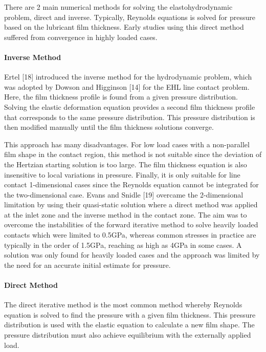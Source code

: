 There are 2 main numerical methods for solving the elastohydrodynamic problem, direct and inverse. Typically, Reynolds equations is solved for pressure based on the lubricant film thickness. Early studies using this direct method suffered from convergence in highly loaded cases.

\paragraph{Inverse Method}

Ertel [18] introduced the inverse method for the hydrodynamic problem, which was adopted by Dowson and Higginson [14] for the EHL line contact problem. Here, the film thickness profile is found from a given pressure distribution. Solving the elastic deformation equation provides a second film thickness profile that corresponds to the same pressure distribution. This pressure distribution is then modified manually until the film thickness solutions converge.

This approach has many disadvantages. For low load cases with a non-parallel film shape in the contact region, this method is not suitable since the deviation of the Hertzian starting solution is too large. The film thickness equation is also insensitive to local variations in pressure. Finally, it is only suitable for line contact 1-dimensional cases since the Reynolds equation cannot be integrated for the two-dimensional case. Evans and Snidle [19] overcame the 2-dimensional limitation by using their quasi-static solution where a direct method was applied at the inlet zone and the inverse method in the contact zone. The aim was to overcome the instabilities of the forward iterative method to solve heavily loaded contacts which were limited to 0.5GPa, whereas common stresses in practice are typically in the order of 1.5GPa, reaching as high as 4GPa in some cases. A solution was only found for heavily loaded cases and the approach was limited by the need for an accurate initial estimate for pressure.

\paragraph{Direct Method}

The direct iterative method is the most common method whereby Reynolds equation is solved to find the pressure with a given film thickness. This pressure distribution is used with the elastic equation to calculate a new film shape. The pressure distribution must also achieve equilibrium with the externally applied load.

